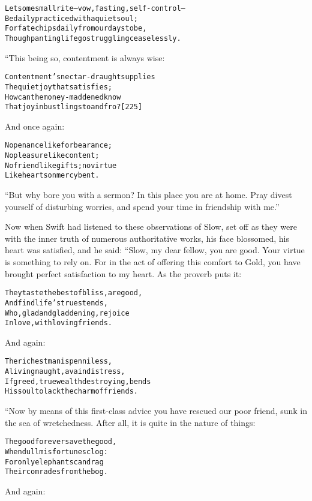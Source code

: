 \documentclass{article}
\renewenvironment{verbatim}{\begin{alltt}\normalfont\begin{centering}}{\end{centering}\end{alltt}}
\begin{document}
\begin{verbatim}
Let some small rite--vow, fasting, self-control--
Be daily practiced with a quiet soul;
For fate chips daily from our days to be,
Though panting life go struggling ceaselessly.
\end{verbatim}
“This being so, contentment is always wise:

\begin{verbatim}
Contentment's nectar-draught supplies
The quiet joy that satisfies;
How can the money-maddened know
That joy in bustlings to and fro?                       [225]
\end{verbatim}
And once again:

\begin{verbatim}
No penance like forbearance;
    No pleasure like content;
No friend like gifts; no virtue
    Like hearts on mercy bent.
\end{verbatim}
``But why bore you with a sermon? In this place you are at home. Pray divest yourself of disturbing worries, and spend your time in friendship with me.''

Now when Swift had listened to these observations of Slow, set off
as they were with the inner truth of numerous authoritative works,
his face blossomed, his heart was satisfied, and he said: “Slow, my
dear fellow, you are good. Your virtue is something to rely on. For
in the act of offering this comfort to Gold, you have brought
perfect satisfaction to my heart. As the proverb puts it:

\begin{verbatim}
They taste the best of bliss, are good,
    And find life's truest ends,
Who, glad and gladdening, rejoice
    In love, with loving friends.
\end{verbatim}
And again:

\begin{verbatim}
The richest man is penniless,
A living naught, a vain distress,
If greed, true wealth destroying, bends
His soul to lack the charm of friends.
\end{verbatim}
“Now by means of this first-class advice you have rescued our poor
friend, sunk in the sea of wretchedness. After all, it is quite in
the nature of things:

\begin{verbatim}
The good forever save the good,
    When dull misfortunes clog:
For only elephants can drag
    Their comrades from the bog.
\end{verbatim}
And again:
\end{document}
